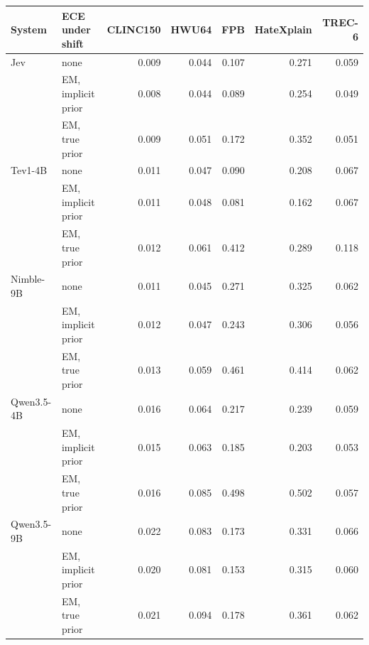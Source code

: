 \begin{tabular}{llrrrrr}
\toprule
System & ECE under shift & CLINC150 & HWU64 & FPB & HateXplain & TREC-6 \\
\midrule
Jev & none & 0.009 & 0.044 & 0.107 & 0.271 & 0.059 \\
\rowcolor{rowhl}  & EM, implicit prior & 0.008 & 0.044 & 0.089 & 0.254 & 0.049 \\
 & EM, true prior & 0.009 & 0.051 & 0.172 & 0.352 & 0.051 \\
\midrule
Tev1-4B & none & 0.011 & 0.047 & 0.090 & 0.208 & 0.067 \\
\rowcolor{rowhl}  & EM, implicit prior & 0.011 & 0.048 & 0.081 & 0.162 & 0.067 \\
 & EM, true prior & 0.012 & 0.061 & 0.412 & 0.289 & 0.118 \\
\midrule
Nimble-9B & none & 0.011 & 0.045 & 0.271 & 0.325 & 0.062 \\
\rowcolor{rowhl}  & EM, implicit prior & 0.012 & 0.047 & 0.243 & 0.306 & 0.056 \\
 & EM, true prior & 0.013 & 0.059 & 0.461 & 0.414 & 0.062 \\
\midrule
Qwen3.5-4B & none & 0.016 & 0.064 & 0.217 & 0.239 & 0.059 \\
\rowcolor{rowhl}  & EM, implicit prior & 0.015 & 0.063 & 0.185 & 0.203 & 0.053 \\
 & EM, true prior & 0.016 & 0.085 & 0.498 & 0.502 & 0.057 \\
\midrule
Qwen3.5-9B & none & 0.022 & 0.083 & 0.173 & 0.331 & 0.066 \\
\rowcolor{rowhl}  & EM, implicit prior & 0.020 & 0.081 & 0.153 & 0.315 & 0.060 \\
 & EM, true prior & 0.021 & 0.094 & 0.178 & 0.361 & 0.062 \\
\bottomrule
\end{tabular}

